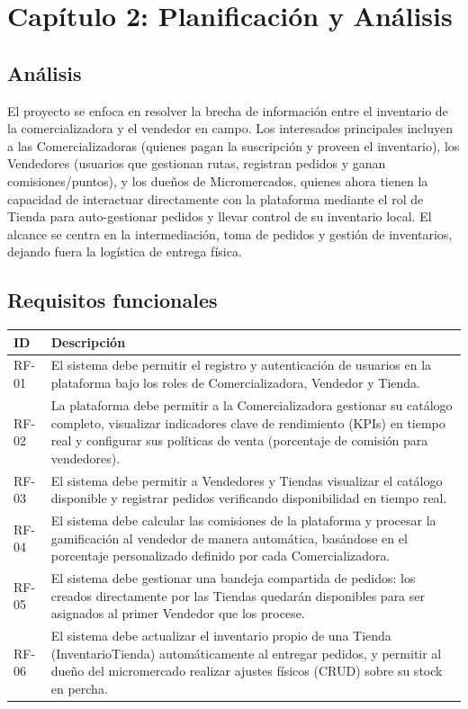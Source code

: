 \documentclass{article}
\begin{document}
\section{Capítulo 2: Planificación y Análisis} 

\subsection{Análisis} 
El proyecto se enfoca en resolver la brecha de información entre el inventario de la comercializadora y el vendedor en campo. 
Los interesados principales incluyen a las Comercializadoras (quienes pagan la suscripción y proveen el inventario), los Vendedores (usuarios que gestionan rutas, registran pedidos y ganan comisiones/puntos), y los dueños de Micromercados, quienes ahora tienen la capacidad de interactuar directamente con la plataforma mediante el rol de Tienda para auto-gestionar pedidos y llevar control de su inventario local. 
El alcance se centra en la intermediación, toma de pedidos y gestión de inventarios, dejando fuera la logística de entrega física. 

\subsection{Requisitos funcionales} 
\begin{table}[h]
\centering
\begin{tabular}{|l|p{12cm}|}
\hline
\textbf{ID} & \textbf{Descripción} \\ \hline
RF-01 & El sistema debe permitir el registro y autenticación de usuarios en la plataforma bajo los roles de Comercializadora, Vendedor y Tienda.  \\ \hline
RF-02 & La plataforma debe permitir a la Comercializadora gestionar su catálogo completo, visualizar indicadores clave de rendimiento (KPIs) en tiempo real y configurar sus políticas de venta (porcentaje de comisión para vendedores).  \\ \hline
RF-03 & El sistema debe permitir a Vendedores y Tiendas visualizar el catálogo disponible y registrar pedidos verificando disponibilidad en tiempo real.  \\ \hline
RF-04 & El sistema debe calcular las comisiones de la plataforma y procesar la gamificación al vendedor de manera automática, basándose en el porcentaje personalizado definido por cada Comercializadora.  \\ \hline
RF-05 & El sistema debe gestionar una bandeja compartida de pedidos: los creados directamente por las Tiendas quedarán disponibles para ser asignados al primer Vendedor que los procese.  \\ \hline
RF-06 & El sistema debe actualizar el inventario propio de una Tienda (InventarioTienda) automáticamente al entregar pedidos, y permitir al dueño del micromercado realizar ajustes físicos (CRUD) sobre su stock en percha.  \\ \hline
\end{tabular}
\end{table}
\end{document}
